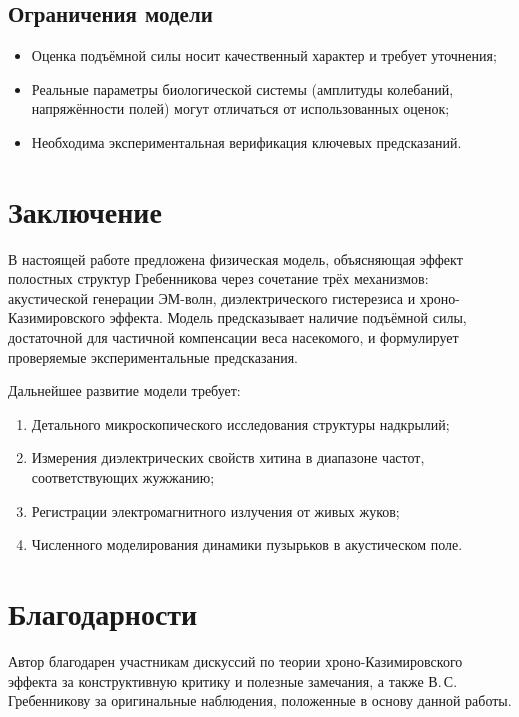 \documentclass[12pt,a4paper]{article}
\begin{document}
\subsection{Ограничения модели}

\begin{itemize}
    \item Оценка подъёмной силы носит качественный характер и требует уточнения;
    \item Реальные параметры биологической системы (амплитуды колебаний, напряжённости полей) могут отличаться от использованных оценок;
    \item Необходима экспериментальная верификация ключевых предсказаний.
\end{itemize}

\section{Заключение}

В настоящей работе предложена физическая модель, объясняющая эффект полостных структур Гребенникова через сочетание трёх механизмов: акустической генерации ЭМ-волн, диэлектрического гистерезиса и хроно-Казимировского эффекта. Модель предсказывает наличие подъёмной силы, достаточной для частичной компенсации веса насекомого, и формулирует проверяемые экспериментальные предсказания.

Дальнейшее развитие модели требует:
\begin{enumerate}
    \item Детального микроскопического исследования структуры надкрылий;
    \item Измерения диэлектрических свойств хитина в диапазоне частот, соответствующих жужжанию;
    \item Регистрации электромагнитного излучения от живых жуков;
    \item Численного моделирования динамики пузырьков в акустическом поле.
\end{enumerate}

\section*{Благодарности}

Автор благодарен участникам дискуссий по теории хроно-Казимировского эффекта за конструктивную критику и полезные замечания, а также В.\,С.\,Гребенникову за оригинальные наблюдения, положенные в основу данной работы.
\end{document}
